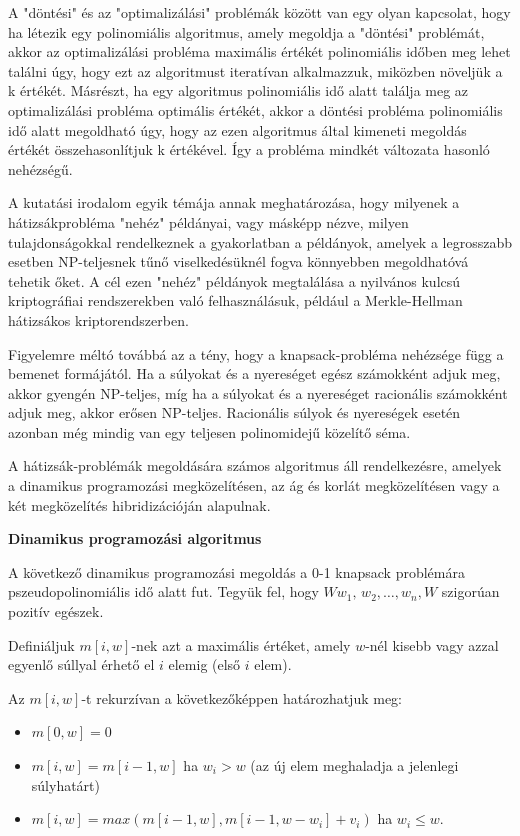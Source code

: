 	A "döntési" és az "optimalizálási" problémák között van egy olyan kapcsolat, hogy ha létezik egy polinomiális algoritmus, amely megoldja a "döntési" problémát, akkor az optimalizálási probléma maximális értékét polinomiális időben meg lehet találni úgy, hogy ezt az algoritmust iteratívan alkalmazzuk, miközben növeljük a k értékét. Másrészt, ha egy algoritmus polinomiális idő alatt találja meg az optimalizálási probléma optimális értékét, akkor a döntési probléma polinomiális idő alatt megoldható úgy, hogy az ezen algoritmus által kimeneti megoldás értékét összehasonlítjuk k értékével. Így a probléma mindkét változata hasonló nehézségű.
	
	A kutatási irodalom egyik témája annak meghatározása, hogy milyenek a hátizsákprobléma "nehéz" példányai, vagy másképp nézve, milyen tulajdonságokkal rendelkeznek a gyakorlatban a példányok, amelyek a legrosszabb esetben NP-teljesnek tűnő viselkedésüknél fogva könnyebben megoldhatóvá tehetik őket. A cél ezen "nehéz" példányok megtalálása a nyilvános kulcsú kriptográfiai rendszerekben való felhasználásuk, például a Merkle-Hellman hátizsákos kriptorendszerben.
	
	Figyelemre méltó továbbá az a tény, hogy a knapsack-probléma nehézsége függ a bemenet formájától. Ha a súlyokat és a nyereséget egész számokként adjuk meg, akkor gyengén NP-teljes, míg ha a súlyokat és a nyereséget racionális számokként adjuk meg, akkor erősen NP-teljes. Racionális súlyok és nyereségek esetén azonban még mindig van egy teljesen polinomidejű közelítő séma. 
	
	
	A hátizsák-problémák megoldására számos algoritmus áll rendelkezésre, amelyek a dinamikus programozási megközelítésen, az ág és korlát megközelítésen vagy a két megközelítés hibridizációján alapulnak.
	
	\textbf{Dinamikus programozási algoritmus}
	
	A következő dinamikus programozási megoldás a 0-1 knapsack problémára pszeudopolinomiális idő alatt fut. Tegyük fel, hogy $W w_{1},\,w_{2},\dots,w_{n},W$ szigorúan pozitív egészek.
	
	Definiáljuk $m [i,w]$-nek azt a maximális értéket, amely $w$-nél kisebb vagy azzal egyenlő súllyal érhető el $i$ elemig (első $i$ elem).
	
	
	Az $m[i,w]$-t rekurzívan a következőképpen határozhatjuk meg:
	\begin{itemize}
	\item{$m[0,w]=0$}
	\item{$m[i,w]=m[i-1,w]$ ha $ w_i > w $}
	(az új elem meghaladja a jelenlegi súlyhatárt)
	\item{$m[i,w]=max(m[i-1,w],m[i-1,w-w_i]+v_i)$ ha $ w_i\leq w.$}
	\end{itemize}

